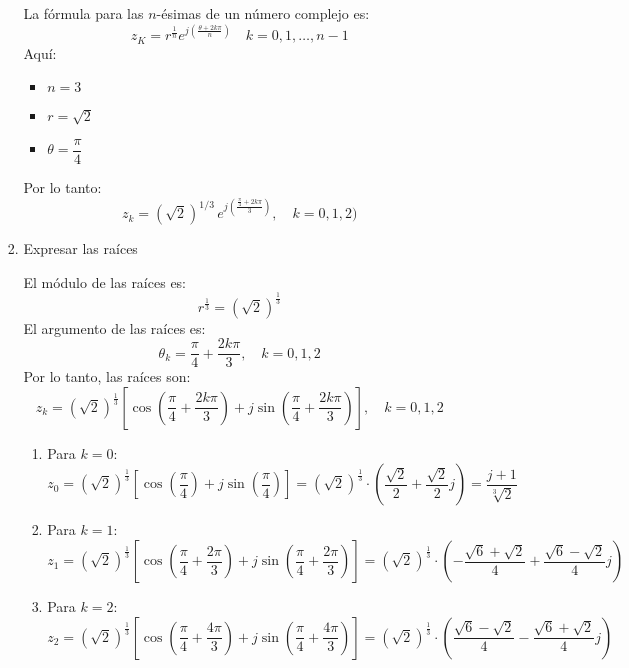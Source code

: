 \begin{enumerate}[label=\color{red}\textbf{\arabic*)}]
\begin{itemize}[label=\textbullet]
\begin{enumerate}[label=Paso \arabic*:]
                    La fórmula para las $n$-ésimas de un número complejo es:  \[
                    z_K=r^{\frac{1}{n} }e^{j\left( \frac{\theta+2k\pi}{n}  \right) }\quad k=0,1,\dots,n-1 
                    \] 
                    Aquí: 
                    \begin{itemize}[label=\textbullet]
                        \item $n=3$
                        \item  $r=\sqrt{2} $ 
                        \item $\theta=\dfrac{\pi}{4}$
                    \end{itemize}
                    Por lo tanto:
                    \[
                    z_k = \left(\sqrt{2}\right)^{1/3} \, e^{j\left(\frac{\frac{\pi}{4} + 2k\pi}{3}\right)}, \quad k = 0, 1, 2)
                    \] 
                \item Expresar las raíces

                    El módulo de las raíces es: \[
                    r^{\frac{1}{3} }=\left( \sqrt{2}  \right) ^{\frac{1}{3} }
                    \] 
                    El argumento de las raíces es: \[
                    \theta_k=\dfrac{\pi}{4} +\dfrac{2k\pi}{3},\quad k=0,1,2
                    \] 
                    Por lo tanto, las raíces son: \[
                    z_k=\left( \sqrt{2}  \right) ^{\frac{1}{3} }\left[ \cos\left( \dfrac{\pi}{4}+\dfrac{2k\pi}{3}  \right) +j\sin\left( \dfrac{\pi}{4}+\dfrac{2k\pi}{3} \right)  \right] ,\quad k=0,1,2
                    \] 
                    \begin{enumerate}[label=\arabic*)]
                        \item Para $k=0$: \[
                        z_0=\left( \sqrt{2}  \right) ^{\frac{1}{3}}\left[ \cos\left( \dfrac{\pi}{4} \right) +j\sin\left( \dfrac{\pi}{4} \right)  \right] =\left( \sqrt{2}  \right) ^{\frac{1}{3} }\cdot \left( \dfrac{\sqrt{2} }{2}+\dfrac{\sqrt{2} }{2}j \right) =\dfrac{j+1}{\sqrt[3]{2} }
                        \] 
                    \item Para $k=1$:  \[
                    z_1=\left( \sqrt{2}  \right) ^{\frac{1}{3} }\left[ \cos\left( \dfrac{\pi}{4}+\dfrac{2\pi}{3} \right) +j\sin\left( \dfrac{\pi}{4}+\dfrac{2\pi}{3} \right)  \right] =\left( \sqrt{2}  \right) ^{\frac{1}{3} }\cdot \left( -\dfrac{\sqrt{6} +\sqrt{2} }{4}+\dfrac{\sqrt{6} -\sqrt{2} }{4}j \right) 
                    \] 
                \item Para $k=2$:
                     \[
                    z_2=\left( \sqrt{2}  \right) ^{\frac{1}{3} }\left[ \cos\left( \dfrac{\pi}{4}+\dfrac{4\pi}{3} \right) +j\sin\left( \dfrac{\pi}{4}+\dfrac{4\pi}{3} \right)  \right] =\left( \sqrt{2}  \right) ^{\frac{1}{3} }\cdot \left( \dfrac{\sqrt{6} -\sqrt{2} }{4}-\dfrac{\sqrt{6} +\sqrt{2} }{4}j \right) 
                
\]
\end{enumerate}
\end{enumerate}
\end{itemize}
\end{enumerate}
